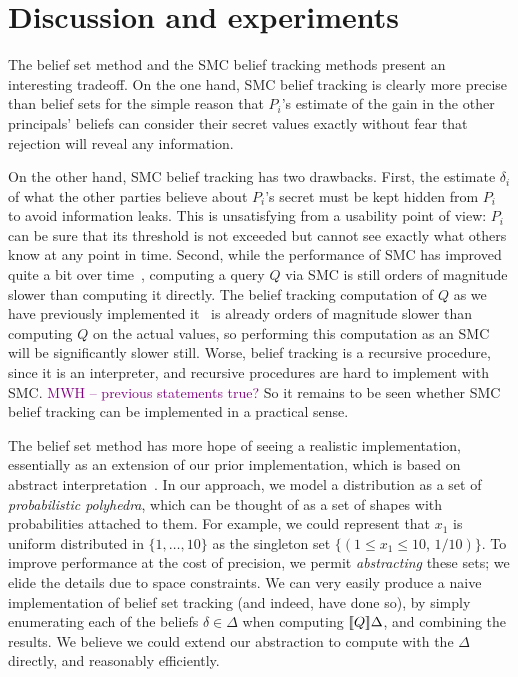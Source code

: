\documentclass[10pt]{sigplanconf}
\newcommand{\mwh}[1]{\textcolor{purple}{MWH -- #1}}
\newcommand{\mwh}[1]{}
\begin{document}
\section{Discussion and experiments}
\label{sec:evaluation}

The belief set method and the SMC belief tracking methods present an
interesting tradeoff.  On the one hand, SMC belief tracking is clearly
more precise than belief sets for the simple reason that $P_i$'s
estimate of the gain in the other principals' beliefs can consider
their secret values exactly without fear that rejection will reveal
any information.

On the other hand, SMC belief tracking has two
drawbacks.  First, the estimate $\delta_i$ of what the other parties
believe about $P_i$'s secret must be kept hidden from $P_i$ to avoid
information leaks.  This is unsatisfying from a usability point of
view: $P_i$ can be sure that its threshold is not exceeded but cannot
see exactly what others know at any point in time.  Second, while the
performance of SMC has improved quite a bit over
time~\cite{huang11fast}, computing a query $Q$ via SMC is still orders
of magnitude slower than computing it directly.  The belief tracking
computation of $Q$ as we have previously implemented
it~\cite{mardziel11belief} is already orders of magnitude slower than
computing $Q$ on the actual values, so performing this computation as
an SMC will be significantly slower still.  Worse, belief tracking is a
recursive procedure, since it is an interpreter, and recursive
procedures are hard to implement with SMC. \mwh{previous statements
  true?}  So it remains to be seen whether SMC belief tracking can be
implemented in a practical sense.

The belief set method has more hope of seeing a realistic
implementation, essentially as an extension of our prior
implementation, which is based on abstract
interpretation~\cite{mardziel11belief}.  In our approach, we model a
distribution as a set of \emph{probabilistic polyhedra}, which can be
thought of as a set of shapes with probabilities attached to them.
For example, we could represent that $x_1$ is uniform distributed in
$\{ 1,\ldots,10 \}$ as the singleton set $\{ (1 \leq x_1 \leq 10,\,
1/10) \}$.  To improve performance at the cost of precision, we permit
\emph{abstracting} these sets; we elide the details due to space
constraints.  We can very easily produce a naive implementation of
belief set tracking (and indeed, have done so), by simply enumerating
each of the beliefs $\delta \in \Delta$ when computing
$[\![{Q}]\!]{\Delta}$, and combining the results.  We believe we could extend
our abstraction to compute with the $\Delta$ directly, and reasonably
efficiently.
\end{document}
